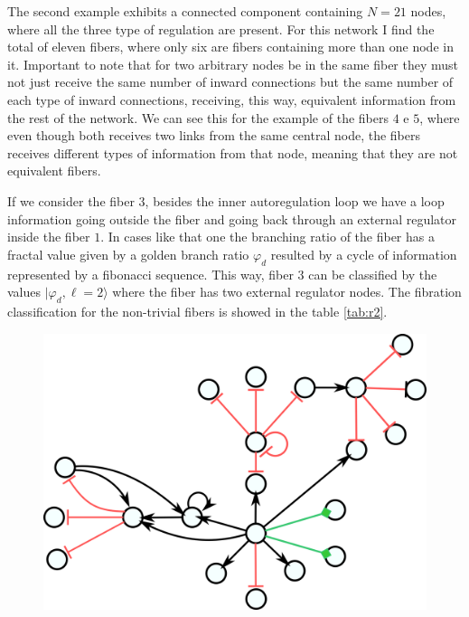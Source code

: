 \documentclass[12pt]{diazessay} %
\begin{document}
The second example exhibits a connected component containing $N = 21$ nodes, where all the three type of regulation are present. For this network I find the total of eleven fibers, where only six are fibers containing more than one node in it. Important to note that for two arbitrary nodes be in the same fiber they must not just receive the same number of inward connections but the same number of each type of inward connections, receiving, this way, equivalent information from the rest of the network. We can see this for the example of the fibers $4$ e $5$, where even though both receives two links from the same central node, the fibers receives different types of information from that node, meaning that they are not equivalent fibers.

If we consider the fiber $3$, besides the inner autoregulation loop we have a loop information going outside the fiber and going back through an external regulator inside the fiber $1$. In cases like that one the branching ratio of the fiber has a fractal value given by a golden branch ratio $\varphi_d$ resulted by a cycle of information represented by a fibonacci sequence. This way, fiber $3$ can be classified by the values $| \varphi_d, \ell = 2 \rangle$ where the fiber has two external regulator nodes. The fibration classification for the non-trivial fibers is showed in the table \ref{tab:r2}.


\begin{figure}[H]
	\centering
	\includegraphics[scale=0.275]{Figures/result2.png}
\end{figure}
\end{document}
